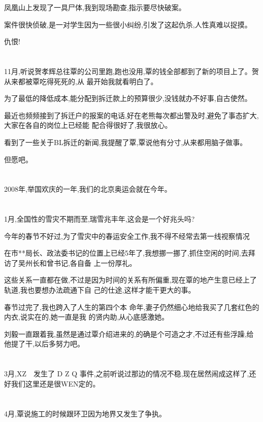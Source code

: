 \documentclass[11pt]{article}
\begin{document}
凤凰山上发现了一具尸体,我到现场勘查,指示要尽快破案。

案件很快侦破,是一对学生因为一些很小纠纷,引发了这起仇杀,人性真难以捉摸。

仇恨!

\section{}
11月,听说贺孝辉总往覃的公司里跑,跑也没用,覃的钱全部都到了新的项目上了。贺从来都被覃吃得死死的,从
最开始我就看明白了。

为了最低的降低成本,能分配到拆迁款上的预算很少,没钱就办不好事,自古使然。

最近也频频接到了拆迁户的报案的电话,好在老熊每次都出警及时,避免了事态扩大,大家在各自的岗位上已经能
配合得很好了,我很放心。

看到了一些关于BL拆迁的新闻,我提醒了覃,覃说他有分寸,从来都用脑子做事。

但愿吧。

\section{}
2008年,举国欢庆的一年,我们的北京奥运会就在今年。

\section{}
1月,全国性的雪灾不期而至,瑞雪兆丰年,这会是一个好兆头吗?

今年的春节不好过,为了雪灾中的春运安全工作,我不得不经常去第一线视察情况

在市**局长、政法委书记的位置上已经5年了,我想挪一挪了,抓住空闲的时间,去拜访了吴州长和曾书记,各自备
上一份厚礼。

这些关系一直都在做,不过是因为时间的关系有所偏重,现在覃的地产生意已经上了轨道,我也要想办法疏通下自
己的仕途,这样才能干更大的事。

春节过完了,我也跨入了人生的第四个本 命年,妻子仍然细心地给我买了几套红色的内衣,说实在的,她一直是我
的贤内助,从心底感激她。

刘毅一直跟着我,虽然是通过覃介绍进来的,的确是个可造之才,不过还有些浮躁,给他提了干,以后多努力吧。

\section{}
3月,XZ~~发生了 D Z Q 事件,之前听说过那边的情况不稳,现在居然闹成这样了,还好我们这里还是很WEN定的。

\section{}
4月,覃说施工的时候跟环卫因为地界又发生了争执。
\end{document}
